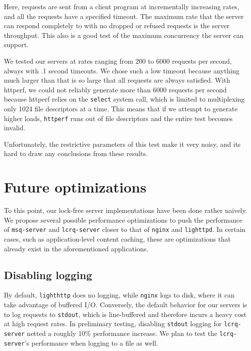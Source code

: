\documentclass[twoside,10pt]{article}
\begin{document}
\begin{multicols}{2}
Here, requests are sent from a client program at incrementally
increasing rates, and all the requests have a specified
timeout. The maximum rate that the server can respond completely to
with no dropped or refused requests is the server throughput. This
also is a good test of the maximum concurrency the server can support.

We tested our servers at rates ranging from 200 to 6000 requests per
second, always with .1 second timeouts. We chose such a low timeout
because anything much larger than that is so large that all requests
are always satisfied. With httperf, we could not reliably generate
more than 6000 requests per second because httperf relies on the
\verb+select+ system call, which is limited to multiplexing only 1024
file descriptors at a time. This means that if we attempt to generate
higher loads, \verb+httperf+ runs out of file descriptors and the
entire test becomes invalid.

Unfortunately, the restrictive parameters of this test make it very noisy, 
and its hard to draw any conclusions from these results. 

\section{Future optimizations}

To this point, our lock-free server implementations have been done
rather naively. We propose several possible performance optimizations
to push the performance of \verb+msq-server+ and \verb+lcrq-server+
closer to that of \verb+nginx+ and \verb+lighttpd+. In certain cases,
such as application-level content caching, these are optimizations
that already exist in the aforementioned applications.

\subsection{Disabling logging}
By default, \verb+lighthttp+ does no logging, while \verb+nginx+ logs
to disk, where it can take advantage of buffered I/O. Conversely, the
default behavior for our servers is to log requests to \verb+stdout+,
which is line-buffered and therefore incurs a heavy cost at high
request rates. In preliminary testing, disabling \verb+stdout+ logging
for \verb+lcrq-server+ netted a roughly 10\% performance increase. We
plan to test the \verb+lcrq-server+'s performance when logging to a
file as well.


\end{multicols}
\end{document}
